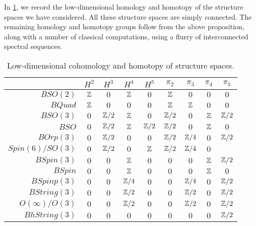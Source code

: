 \documentclass{amsart}
\begin{document}
In \cref{table-structurecalc}, we record the low-dimensional homology and homotopy of the structure spaces we have considered.  All these structure spaces are simply connected.  The remaining homology and homotopy groups follow from the above proposition, along with a number of classical computations, using a flurry of interconnected spectral sequences.  

\begin{table}[!ht]
\begin{tabular}{|r||c|c|c|c||c|c|c|c|}
\hline
& $H^2$ & $H^3$ & $H^4$ & $H^5$ & $\pi_2$ & $\pi_3$ & $\pi_4$ & $\pi_5$ \\
\hline
$BSO(2)$ %
& $\mathbb Z$ & $0$ & $\mathbb Z$ & $0$ 
& $\mathbb Z$ & $0$ & $0$ & $0$ \\
$BQuad$ %
& $\mathbb Z$ & $0$ & $0$ & $0$
& $\mathbb Z$ & $\mathbb Z$ & $0$ & $0$ \\
$BSO(3)$ %
& $0$ & $\mathbb Z/2$ & $\mathbb Z$ & $0$
& $\mathbb Z/2$ & $0$ & $\mathbb Z$ & $\mathbb Z/2$ \\ %
$BSO$
& $0$ & $\mathbb Z/2$ & $\mathbb Z$ & $\mathbb Z/2$ %
& $\mathbb Z/2$ & $0$ & $\mathbb Z$ & $0$ \\ %
$BOrp(3)$ %
& $0$ & $\mathbb Z/2$ & $0$ & $0$ 
& $\mathbb Z/2$ & $\mathbb Z/4$ & $0$ & $\mathbb Z/2$  \\
$Spin(6)/SO(3)$ %
& $0$ & $\mathbb Z/2$ & $0$ & $\mathbb Z$ %
& $\mathbb Z/2$ & $\mathbb Z/4$ & $0$ & \CDcomm{$??$} \\
$BSpin(3)$ %
& $0$ & $0$ & $\mathbb Z$ & $0$
& $0$ & $0$ & $\mathbb Z$ & $\mathbb Z/2$ \\
$BSpin$
& $0$ & $0$ & $\mathbb Z$ & $0$ %
& $0$ & $0$ & $\mathbb Z$ & $0$ \\ %
$BSpinp(3)$
& $0$ & $0$ & $\mathbb Z/4$ & $0$
& $0$ & $\mathbb Z/4$ & $0$ & $\mathbb Z/2$ \\
$BString(3)$ %
& $0$ & $0$ & $\mathbb Z/2$ & $0$
& $0$ & $\mathbb Z/2$ & $0$ & $\mathbb Z/2$ \\
$O(\infty)/O(3)$ %
& $0$ & $0$ & $\mathbb Z/2$ & $0$
& $0$ & $\mathbb Z/2$ & $0$ & $\mathbb Z/2$ \\
$BhString(3)$ %
& $0$ & $0$ & $0$ & $0$
& $0$ & $0$ & $0$ & $\mathbb Z/2$ \\
\hline 
\end{tabular} \vspace*{8pt}
\caption{Low-dimensional cohomology and homotopy of structure spaces.} \label{table-structurecalc}
\end{table} 
\end{document}
